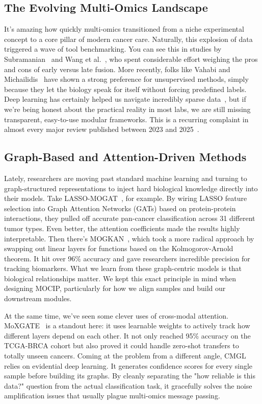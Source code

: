 \documentclass[conference,flushend]{iaria} %
\begin{document}
\subsection{The Evolving Multi-Omics Landscape}
It's amazing how quickly multi-omics transitioned from a niche experimental concept to a core pillar of modern cancer care. Naturally, this explosion of data triggered a wave of tool benchmarking. You can see this in studies by Subramanian~\cite{subramanian2020} and Wang et al.~\cite{wang2021evaluation}, who spent considerable effort weighing the pros and cons of early versus late fusion. More recently, folks like Vahabi and Michailidis~\cite{vahabi2022unsupervised} have shown a strong preference for unsupervised methods, simply because they let the biology speak for itself without forcing predefined labels. Deep learning has certainly helped us navigate incredibly sparse data~\cite{kang2022roadmap}, but if we're being honest about the practical reality in most labs, we are still missing transparent, easy-to-use modular frameworks. This is a recurring complaint in almost every major review published between 2023 and 2025~\cite{wekesa2023review,abdelaziz2024multi,muneer2025review}.

\subsection{Graph-Based and Attention-Driven Methods}
Lately, researchers are moving past standard machine learning and turning to graph-structured representations to inject hard biological knowledge directly into their models. Take LASSO-MOGAT~\cite{alharbi2024lassomogat}, for example. By wiring LASSO feature selection into Graph Attention Networks (GATs) based on protein-protein interactions, they pulled off accurate pan-cancer classification across 31 different tumor types. Even better, the attention coefficients made the results highly interpretable. Then there's MOGKAN~\cite{alharbi2025mogkan}, which took a more radical approach by swapping out linear layers for functions based on the Kolmogorov-Arnold theorem. It hit over 96\% accuracy and gave researchers incredible precision for tracking biomarkers. What we learn from these graph-centric models is that biological relationships matter. We kept this exact principle in mind when designing MOCIP, particularly for how we align samples and build our downstream modules.

At the same time, we've seen some clever uses of cross-modal attention. MoXGATE~\cite{dip2025moxgate} is a standout here: it uses learnable weights to actively track how different layers depend on each other. It not only reached 95\% accuracy on the TCGA-BRCA cohort but also proved it could handle zero-shot transfers to totally unseen cancers. Coming at the problem from a different angle, CMGL~\cite{fan2026cmgl} relies on evidential deep learning. It generates confidence scores for every single sample before building its graphs. By cleanly separating the "how reliable is this data?" question from the actual classification task, it gracefully solves the noise amplification issues that usually plague multi-omics message passing.
\end{document}
